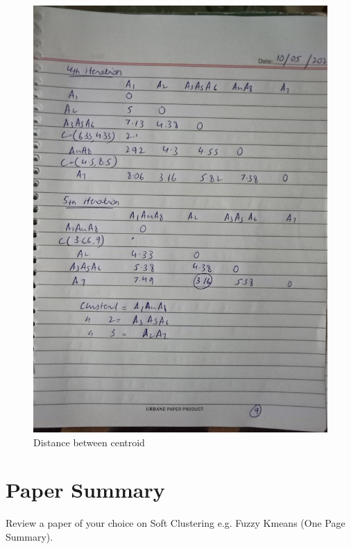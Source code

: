 \documentclass[12pt]{article}
\begin{document}
\begin{figure}
  \includegraphics[width=\linewidth]{9.jpg}
  \caption{Distance between centroid}
  \label{pic9}
\end{figure}

\clearpage

\section{Paper Summary}

Review a paper of your choice on Soft Clustering e.g. Fuzzy Kmeans (One Page Summary). \newline
\end{document}
